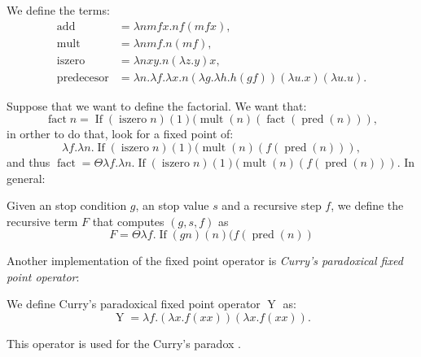 \begin{definition}
  We define the terms:
  \begin{align*}
    \operatorname{add} &= \lambda nm f x.nf (mf x),\\
    \operatorname{mult} &= \lambda nm f.n(mf),\\
    \operatorname{iszero} &= \lambda nxy.n(\lambda z.y)x,\\
    \operatorname{predecesor} &=\lambda n.\lambda f.\lambda x. n (\lambda g.\lambda h. h (g f)) (\lambda u.x) (\lambda u.u). 
  \end{align*}
  
\end{definition}
Suppose that we want to define the factorial. We want that:
$$\operatorname{fact} n = \operatorname{If}(\operatorname{iszero} n)(1)(\operatorname{mult}(n)(\operatorname{fact} (\operatorname{pred}(n))),$$
in orther to do that, look for a fixed point of:
$$\lambda f. \lambda n.\operatorname{If}(\operatorname{iszero}n)(1)(\operatorname{mult}(n)(f (\operatorname{pred}(n))),$$
and thus $\operatorname{fact}=\Theta \lambda f.\lambda n. \operatorname{If}(\operatorname{iszero}n)(1)(\operatorname{mult}(n)(f (\operatorname{pred}(n)))$. In general:

\begin{definition}
  Given an stop condition $g$, an stop value $s$ and a recursive step $f$, we define the recursive term $F$ that computes $(g,s,f)$ as
  $$F = \Theta \lambda f. \operatorname{If}(gn)(n)(f (\operatorname{pred}(n))$$
\end{definition}

Another implementation of the fixed point operator is \emph{Curry's paradoxical fixed point operator}:

\begin{definition}
  We define Curry's paradoxical fixed point operator $\operatorname{Y}$ as:
  $$\operatorname{Y}=\lambda f.(\lambda x.f(x x)) (\lambda x.f(x x)).$$
\end{definition}

This operator is used for the Curry's paradox \cite{sep-curry-paradox}.\\




